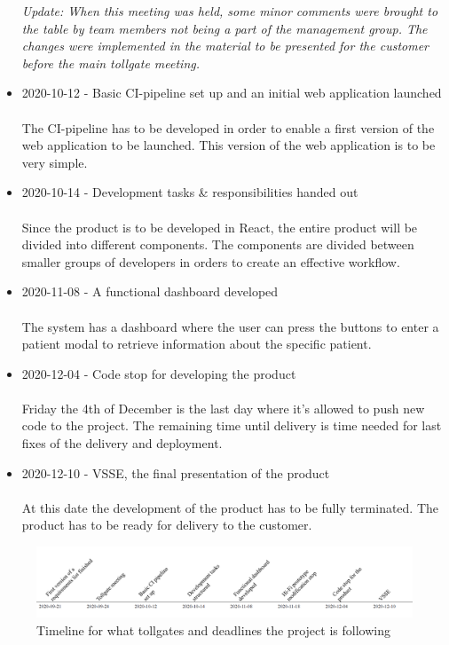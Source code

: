 \begin{itemize}
    \textit{Update: When this meeting was held, some minor comments were brought to the table by team members not being a part of the management group. The changes were implemented in the material to be presented for the customer before the main tollgate meeting.} 
    \item 2020-10-12 - Basic CI-pipeline set up and an initial web application launched\\ \\
    The CI-pipeline has to be developed in order to enable a first version of the web application to be launched. This version of the web application is to be very simple. 
    \item 2020-10-14 - Development tasks \& responsibilities handed out \\ \\
    Since the product is to be developed in React, the entire product will be divided into different components. The components are divided between smaller groups of developers in orders to create an effective workflow.
    \item 2020-11-08 - A functional dashboard developed \\ \\
    The system has a dashboard where the user can press the buttons to enter a patient modal to retrieve information about the specific patient. 
    \item 2020-12-04 - Code stop for developing the product\\ \\
    Friday the 4th of December is the last day where it's allowed to push new code to the project. The remaining time until delivery is time needed for last fixes of the delivery and deployment.
    \item 2020-12-10 - VSSE, the final presentation of the product\\ \\
    At this date the development of the product has to be fully terminated. The product has to be ready for delivery to the customer. 
\end{itemize}   

\begin{figure}[H]
\centering
\includegraphics[width=\linewidth]{Pictures/timeline.PNG}
\caption{Timeline for what tollgates and deadlines the project is following}
\label{fig:timeline}
\end{figure}


